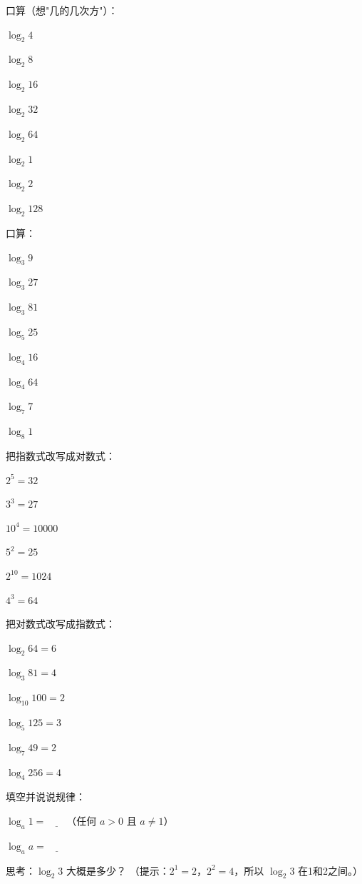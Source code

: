 \begin{exercise}
\item 口算（想"几的几次方"）：
  \begin{subexercise}
    \item $\log_2 4$
    \item $\log_2 8$
    \item $\log_2 16$
    \item $\log_2 32$
    \item $\log_2 64$
    \item $\log_2 1$
    \item $\log_2 2$
    \item $\log_2 128$
  \end{subexercise}

\item 口算：
  \begin{subexercise}
    \item $\log_3 9$
    \item $\log_3 27$
    \item $\log_3 81$
    \item $\log_5 25$
    \item $\log_4 16$
    \item $\log_4 64$
    \item $\log_7 7$
    \item $\log_8 1$
  \end{subexercise}

\item 把指数式改写成对数式：
  \begin{subexercise}
    \item $2^5=32$
    \item $3^3=27$
    \item $10^4=10000$
    \item $5^2=25$
    \item $2^{10}=1024$
    \item $4^3=64$
  \end{subexercise}

\item 把对数式改写成指数式：
  \begin{subexercise}
    \item $\log_2 64 = 6$
    \item $\log_3 81 = 4$
    \item $\log_{10} 100 = 2$
    \item $\log_5 125 = 3$
    \item $\log_7 49 = 2$
    \item $\log_4 256 = 4$
  \end{subexercise}

\item 填空并说说规律：
  \begin{subexercise}
    \item $\log_a 1 = \underline{\qquad}$（任何 $a>0$ 且 $a\neq1$）
    \item $\log_a a = \underline{\qquad}$
  \end{subexercise}

\item 思考：$\log_2 3$ 大概是多少？
  （提示：$2^1=2$，$2^2=4$，所以 $\log_2 3$ 在1和2之间。）
\end{exercise}

